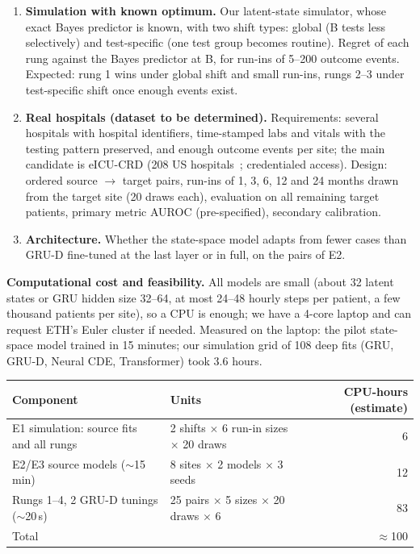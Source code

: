 \documentclass[11pt,a4paper]{article}
\begin{document}
\begin{enumerate}[label=\textbf{E\arabic*},leftmargin=2em]
  \item \textbf{Simulation with known optimum.} Our latent-state simulator, whose exact Bayes predictor is known, with two shift types: global (B tests less selectively) and test-specific (one test group becomes routine). Regret of each rung against the Bayes predictor at B, for run-ins of 5--200 outcome events. Expected: rung 1 wins under global shift and small run-ins, rungs 2--3 under test-specific shift once enough events exist.
  \item \textbf{Real hospitals (dataset to be determined).} Requirements: several hospitals with hospital identifiers, time-stamped labs and vitals with the testing pattern preserved, and enough outcome events per site; the main candidate is eICU-CRD (208 US hospitals~\cite{pollard2018}; credentialed access). Design: ordered source $\to$ target pairs, run-ins of 1, 3, 6, 12 and 24 months drawn from the target site (20 draws each), evaluation on all remaining target patients, primary metric AUROC (pre-specified), secondary calibration.
  \item \textbf{Architecture.} Whether the state-space model adapts from fewer cases than GRU-D fine-tuned at the last layer or in full, on the pairs of E2.
\end{enumerate}

\textbf{Computational cost and feasibility.} All models are small (about 32 latent states or GRU hidden size 32--64, at most 24--48 hourly steps per patient, a few thousand patients per site), so a CPU is enough; we have a 4-core laptop and can request ETH's Euler cluster if needed. Measured on the laptop: the pilot state-space model trained in 15 minutes; our simulation grid of 108 deep fits (GRU, GRU-D, Neural CDE, Transformer) took 3.6 hours.

\begin{tabularx}{\linewidth}{@{}Xlr@{}}
\toprule
Component & Units & CPU-hours (estimate) \\
\midrule
E1 simulation: source fits and all rungs & 2 shifts $\times$ 6 run-in sizes $\times$ 20 draws & 6 \\
E2/E3 source models ($\sim$15\,min) & 8 sites $\times$ 2 models $\times$ 3 seeds & 12 \\
Rungs 1--4, 2 GRU-D tunings ($\sim$20\,s) & 25 pairs $\times$ 5 sizes $\times$ 20 draws $\times$ 6 & 83 \\
\midrule
Total & & $\approx$100 \\
\bottomrule
\end{tabularx}
\end{document}
